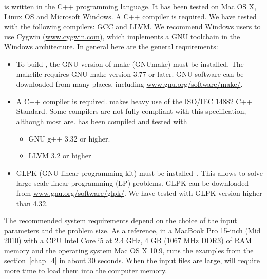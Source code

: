 \pump{} is written in the C++ programming language. It has been tested on Mac OS X, Linux OS and Microsoft Windows. A C++ compiler is required. We have tested \pump{} with the following compilers: GCC and LLVM.  We recommend Windows users to use Cygwin (\url{www.cygwin.com}), which implements a GNU toolchain in the Windows architecture. In general here are the general requirements:
\begin{itemize}
\item {To build \pump{}, the GNU version of make (GNUmake) must be installed. The \pump{} makefile requires GNU make version 3.77 or later. GNU software can be downloaded from many places, including \url{www.gnu.org/software/make/}.}
\item {A C++ compiler is required. \pump{} makes heavy use of the ISO/IEC 14882 C++ Standard. Some compilers are not fully compliant with this specification, although most are. \pump{} has been compiled and tested with
\begin{itemize}
\item {GNU g++ 3.32 or higher.}
\item {LLVM 3.2 or higher}
\end{itemize}}
\item {GLPK (GNU linear programming kit) must be installed~\cite{Glpk}. This allows \pump{} to solve large-scale linear programming (LP) problems. GLPK can be downloaded from \url{www.gnu.org/software/glpk/}. We have tested \pump{} with GLPK version higher than 4.32.}
\end{itemize}
The recommended system requirements depend on the choice of the input parameters and the problem size. As a reference, in a MacBook Pro 15-inch (Mid 2010) with a CPU Intel Core i5 at 2.4 GHz, 4 GB (1067 MHz DDR3) of RAM memory and the operating system Mac OS X 10.9, \pump{} runs the examples from the section~\ref{chap_4} in about 30 seconds. When the input files are large, \pump{} will require more time to load them into the computer memory.





























